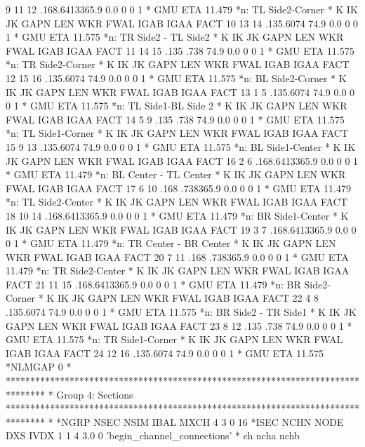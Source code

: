     9   11   12 .168.6413365.9  0.0    0    0    1
* GMU  ETA
    11.479
*n: TL Side2-Corner
*   K   IK   JK GAPN  LEN  WKR FWAL IGAB IGAA FACT
   10   13   14 .135.6074 74.9  0.0    0    0    1
* GMU  ETA
    11.575
*n: TR Side2 - TL Side2
*   K   IK   JK GAPN  LEN  WKR FWAL IGAB IGAA FACT
   11   14   15 .135 .738 74.9  0.0    0    0    1
* GMU  ETA
    11.575
*n: TR Side2-Corner
*   K   IK   JK GAPN  LEN  WKR FWAL IGAB IGAA FACT
   12   15   16 .135.6074 74.9  0.0    0    0    1
* GMU  ETA
    11.575
*n: BL Side2-Corner
*   K   IK   JK GAPN  LEN  WKR FWAL IGAB IGAA FACT
   13    1    5 .135.6074 74.9  0.0    0    0    1
* GMU  ETA
    11.575
*n: TL Side1-BL Side 2
*   K   IK   JK GAPN  LEN  WKR FWAL IGAB IGAA FACT
   14    5    9 .135 .738 74.9  0.0    0    0    1
* GMU  ETA
    11.575
*n: TL Side1-Corner
*   K   IK   JK GAPN  LEN  WKR FWAL IGAB IGAA FACT
   15    9   13 .135.6074 74.9  0.0    0    0    1
* GMU  ETA
    11.575
*n: BL Side1-Center
*   K   IK   JK GAPN  LEN  WKR FWAL IGAB IGAA FACT
   16    2    6 .168.6413365.9  0.0    0    0    1
* GMU  ETA
    11.479
*n: BL Center - TL Center
*   K   IK   JK GAPN  LEN  WKR FWAL IGAB IGAA FACT
   17    6   10 .168 .738365.9  0.0    0    0    1
* GMU  ETA
    11.479
*n: TL Side2-Center
*   K   IK   JK GAPN  LEN  WKR FWAL IGAB IGAA FACT
   18   10   14 .168.6413365.9  0.0    0    0    1
* GMU  ETA
    11.479
*n: BR Side1-Center
*   K   IK   JK GAPN  LEN  WKR FWAL IGAB IGAA FACT
   19    3    7 .168.6413365.9  0.0    0    0    1
* GMU  ETA
    11.479
*n: TR Center - BR Center
*   K   IK   JK GAPN  LEN  WKR FWAL IGAB IGAA FACT
   20    7   11 .168 .738365.9  0.0    0    0    1
* GMU  ETA
    11.479
*n: TR Side2-Center
*   K   IK   JK GAPN  LEN  WKR FWAL IGAB IGAA FACT
   21   11   15 .168.6413365.9  0.0    0    0    1
* GMU  ETA
    11.479
*n: BR Side2-Corner
*   K   IK   JK GAPN  LEN  WKR FWAL IGAB IGAA FACT
   22    4    8 .135.6074 74.9  0.0    0    0    1
* GMU  ETA
    11.575
*n: BR Side2 - TR Side1
*   K   IK   JK GAPN  LEN  WKR FWAL IGAB IGAA FACT
   23    8   12 .135 .738 74.9  0.0    0    0    1
* GMU  ETA
    11.575
*n: TR Side1-Corner
*   K   IK   JK GAPN  LEN  WKR FWAL IGAB IGAA FACT
   24   12   16 .135.6074 74.9  0.0    0    0    1
* GMU  ETA
    11.575
*NLMGAP
    0
*
********************************************************************************
* Group 4: Sections
********************************************************************************
*
*NGRP NSEC NSIM IBAL MXCH
    4    3    0        16
*ISEC NCHN NODE       DXS IVDX
    1    1    4       3.0    0
'begin_channel_connections'
*  ch ncha nchb

